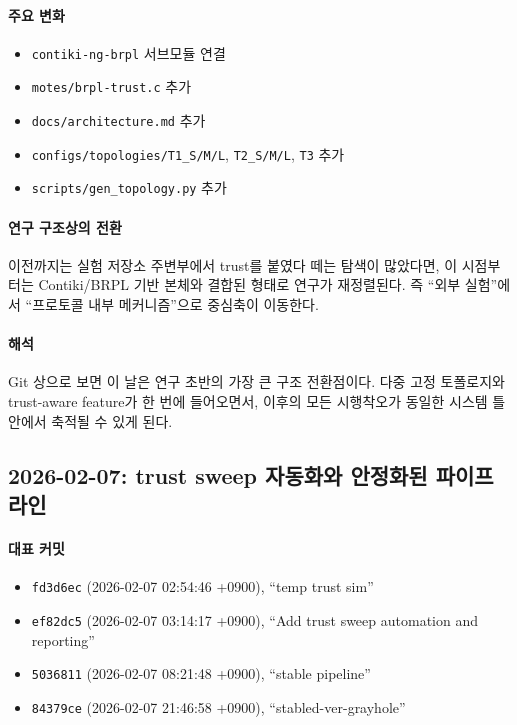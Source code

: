 \documentclass[12pt,a4paper]{article}
\begin{document}
\paragraph{주요 변화}
\begin{itemize}[leftmargin=1.5em]
\item \texttt{contiki-ng-brpl} 서브모듈 연결
\item \texttt{motes/brpl-trust.c} 추가
\item \texttt{docs/architecture.md} 추가
\item \texttt{configs/topologies/T1\_S/M/L}, \texttt{T2\_S/M/L}, \texttt{T3} 추가
\item \texttt{scripts/gen\_topology.py} 추가
\end{itemize}

\paragraph{연구 구조상의 전환}
이전까지는 실험 저장소 주변부에서 trust를 붙였다 떼는 탐색이 많았다면,
이 시점부터는 Contiki/BRPL 기반 본체와 결합된 형태로 연구가 재정렬된다.
즉 ``외부 실험''에서 ``프로토콜 내부 메커니즘''으로 중심축이 이동한다.

\paragraph{해석}
Git 상으로 보면 이 날은 연구 초반의 가장 큰 구조 전환점이다.
다중 고정 토폴로지와 trust-aware feature가 한 번에 들어오면서,
이후의 모든 시행착오가 동일한 시스템 틀 안에서 축적될 수 있게 된다.

\subsection{2026-02-07: trust sweep 자동화와 안정화된 파이프라인}

\paragraph{대표 커밋}
\begin{itemize}[leftmargin=1.5em]
\item \texttt{fd3d6ec} (2026-02-07 02:54:46 +0900), ``temp trust sim''
\item \texttt{ef82dc5} (2026-02-07 03:14:17 +0900), ``Add trust sweep automation and reporting''
\item \texttt{5036811} (2026-02-07 08:21:48 +0900), ``stable pipeline''
\item \texttt{84379ce} (2026-02-07 21:46:58 +0900), ``stabled-ver-grayhole''
\end{itemize}
\end{document}
